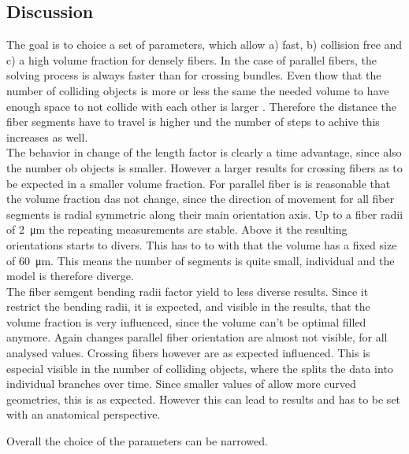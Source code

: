\subsection{Discussion}
% 

% 
% 
The goal is to choice a set of parameters, which allow a) fast, b) collision free and c) a high volume fraction for densely fibers.
In the case of parallel fibers, the solving process is always faster than for crossing bundles.
Even thow that the number of colliding objects is more or less \dummy{} the same  the needed volume to have enough space to not collide with each other is larger \dummy{}.
Therefore the distance the fiber segments have to travel is higher und the number of steps to achive this increases as well.
\\
% 
The behavior in change of the length factor \segLengthFactor{} is clearly a time advantage, since also the number ob objects is smaller.
However a larger \segLengthFactor{} results for crossing fibers as to be expected in a smaller volume fraction.
For parallel fiber is is reasonable that the volume fraction das not change, since the direction of movement for all fiber segments is radial symmetric along their main orientation axis.
Up to a fiber radii of \SI{2}{\micro\meter} the repeating measurements are stable.
Above it the resulting orientations starts to divers.
This has to to with that the volume has a fixed size of \SI{60}{\micro\meter}.
This means the number of segments is quite small, individual and the model is therefore diverge.
\\
The fiber semgent bending radii factor \segRadiusFactor{} yield to less diverse results.
Since it restrict the bending radii, it is expected, and visible in the results, that the volume fraction is very influenced, since the volume can't be optimal filled anymore.
Again changes parallel fiber orientation are almost not visible, for all analysed values.
Crossing fibers however are as expected influenced.
This is especial visible in the number of colliding objects, where the \segRadiusFactor{} splits the data into individual branches over time.
Since smaller values of \segRadiusFactor{} allow more curved geometries, this is as expected.
However this can lead to  results and has to be set with an anatomical perspective. 
\par
% 
Overall the choice of the parameters can be narrowed.
